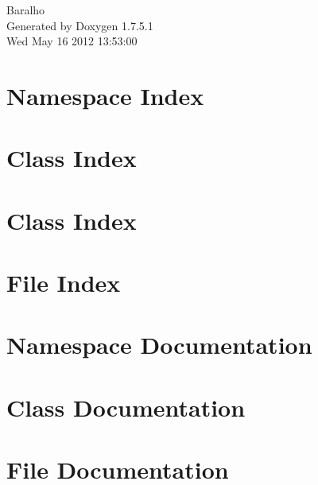 \documentclass[a4paper]{book}
\begin{document}
\hypersetup{pageanchor=false,citecolor=blue}
\begin{titlepage}
\vspace*{7cm}
\begin{center}
{\Large \-Baralho }\\
\vspace*{1cm}
{\large \-Generated by Doxygen 1.7.5.1}\\
\vspace*{0.5cm}
{\small Wed May 16 2012 13:53:00}\\
\end{center}
\end{titlepage}
\clearemptydoublepage
{}
\tableofcontents
\clearemptydoublepage
{}
\hypersetup{pageanchor=true,citecolor=blue}
\chapter{\-Namespace \-Index}

\chapter{\-Class \-Index}

\chapter{\-Class \-Index}

\chapter{\-File \-Index}

\chapter{\-Namespace \-Documentation}


\chapter{\-Class \-Documentation}










\chapter{\-File \-Documentation}











\printindex
\end{document}
